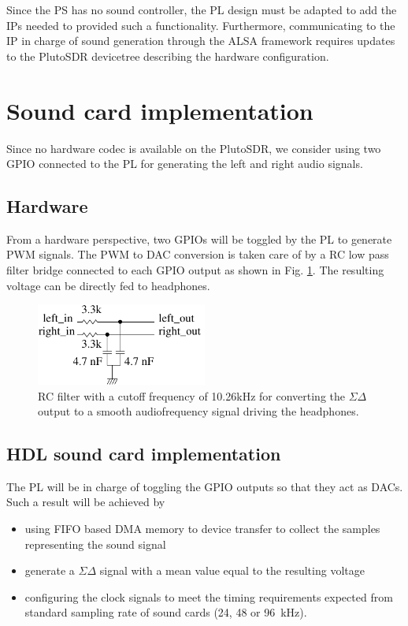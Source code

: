 \documentclass[12pt,oneside]{article}
\begin{document}
Since the PS has no sound controller, the PL design must be adapted to add the IPs needed 
to provided such a functionality. Furthermore, communicating to the IP in charge of sound generation
through the ALSA framework requires updates to the PlutoSDR devicetree describing the hardware 
configuration.

\section{Sound card implementation}

Since no hardware codec is available on the PlutoSDR, we consider using two GPIO connected to the
PL for generating the left and right audio signals.

\subsection{Hardware}

From a hardware perspective, two GPIOs will be toggled by the PL to generate PWM signals. The
PWM to DAC conversion is taken care of by a RC low pass filter bridge connected to each GPIO output
as shown in Fig. \ref{rf_filter}. The resulting voltage can be directly fed to headphones.

\begin{figure}[h!tb]
\center\includegraphics[width=0.5\textwidth]{./figures/RC_filter}
\caption{RC filter with a cutoff frequency of 10.26kHz for converting the $\Sigma\Delta$ output to a smooth
audiofrequency signal driving the headphones.}
\label{rf_filter}
\end{figure}

\subsection{HDL sound card implementation}

The PL will be in charge of toggling the GPIO outputs so that they act as DACs. Such
a result will be achieved by
\begin{itemize}
\item using FIFO based DMA memory to device transfer to collect the samples representing the sound signal
\item generate a $\Sigma\Delta$ signal with a mean value equal to the resulting voltage
\item configuring the clock signals to meet the timing requirements expected from standard
sampling rate of sound cards (24, 48 or 96~kHz).
\end{itemize}
\end{document}
